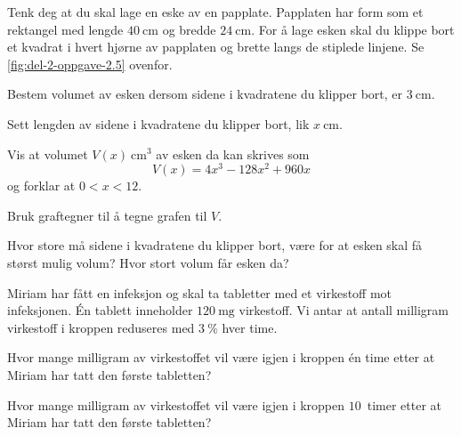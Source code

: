 Tenk deg at du skal lage en eske av en papplate. Papplaten har form som et
rektangel med lengde $\SI{40}{\cm}$ og bredde $\SI{24}{\cm}$. For å lage esken
skal du klippe bort et kvadrat i hvert hjørne av papplaten og brette langs de
stiplede linjene. Se \cref{fig:del-2-oppgave-2.5} ovenfor.

\begin{oppgaver}
   Bestem volumet av esken dersom sidene i kvadratene du klipper bort,
  er $\SI{3}{\cm}$.
\end{oppgaver}

Sett lengden av sidene i kvadratene du klipper bort, lik $x~\si{\cm}$.

\begin{oppgaver}
   Vis at volumet $V(x)~\si{\cm\cubed}$ av esken da kan skrives som
    \begin{equation*}
      V(x) = 4x^3 - 128x^2 + 960x
    \end{equation*}
    og forklar at $0 < x < 12$.
\end{oppgaver}

\begin{oppgaver}
   Bruk graftegner til å tegne grafen til $V$.
\end{oppgaver}

\begin{oppgaver}
   Hvor store må sidene i kvadratene du klipper bort, være for at esken
    skal få størst mulig volum? Hvor stort volum får esken da?
\end{oppgaver}


\Oppgave[6]

Miriam har fått en infeksjon og skal ta tabletter med et virkestoff mot
infeksjonen. Én tablett inneholder $\SI{120}{\milli\gram}$ virkestoff. Vi antar
at antall milligram virkestoff i kroppen reduseres med $\SI{3}{\percent}$ hver
time.

\begin{oppgaver}
   Hvor mange milligram av virkestoffet vil være igjen i kroppen én time
    etter at Miriam har tatt den første tabletten?
\end{oppgaver}

\begin{oppgaver}
   Hvor mange milligram av virkestoffet vil være igjen i kroppen
    $10$~timer etter at Miriam har tatt den første tabletten?
\end{oppgaver}


